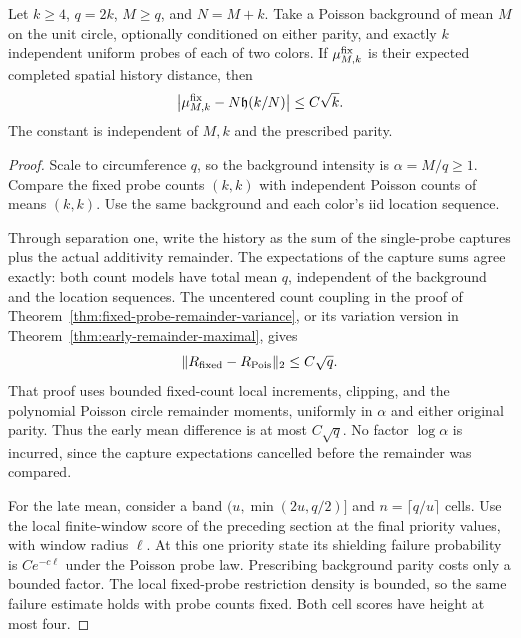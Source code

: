 \documentclass[11pt,letterpaper]{article}
\begin{document}
\begin{lemma}
\label{lem:fixed-probe-profile-mean}
Let $k\ge4$, $q=2k$, $M\ge q$, and $N=M+k$.
Take a Poisson background of mean $M$ on the unit circle,
optionally conditioned on either parity, and exactly $k$
independent uniform probes of each of two colors.
If $\mu_{M,k}^{\rm fix}$ is their expected completed spatial
history distance, then
\begin{equation}\label{eq:fixed-probe-profile-mean}
 \left|\mu_{M,k}^{\rm fix}-N\mathfrak h(k/N)\right|
                                                    \le C\sqrt k.
\end{equation}
The constant is independent of $M,k$ and the prescribed parity.
\end{lemma}
\begin{proof}
Scale to circumference $q$, so the background intensity
is $\alpha=M/q\ge1$. Compare the fixed probe counts
$(k,k)$ with independent Poisson counts of means $(k,k)$.
Use the same background and each color's iid location sequence.

Through separation one, write the history as the sum of
the single-probe captures plus the actual additivity
remainder. The expectations of the capture sums agree
exactly: both count models have total mean $q$, independent
of the background and the location sequences.
The uncentered count coupling in the proof of
Theorem~\ref{thm:fixed-probe-remainder-variance}, or its
variation version in
Theorem~\ref{thm:early-remainder-maximal}, gives
\[
 \|R_{\rm fixed}-R_{\rm Pois}\|_2\le C\sqrt q.
\]
That proof uses bounded fixed-count local increments,
clipping, and the polynomial Poisson circle remainder
moments, uniformly in $\alpha$ and either original parity.
Thus the early mean difference is at most $C\sqrt q$.
No factor $\log\alpha$ is incurred, since the capture
expectations cancelled before the remainder was compared.

For the late mean, consider a band $(u,\min(2u,q/2)]$
and $n=\lceil q/u\rceil$ cells.
Use the local finite-window score of the preceding section
at the final priority values, with window radius $\ell$.
At this one priority state its shielding failure probability
is $Ce^{-c\ell}$ under the Poisson probe law.
Prescribing background parity costs only a bounded factor.
The local fixed-probe restriction density is bounded, so
the same failure estimate holds with probe counts fixed.
Both cell scores have height at most four.


\end{proof}
\end{document}
